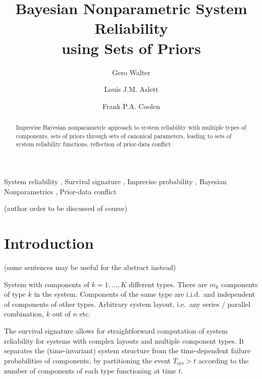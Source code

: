 \documentclass[12pt, a4paper]{elsarticle}
\def\Tsys{T_\text{sys}}
\begin{document}

\begin{frontmatter}
\title{Bayesian Nonparametric System Reliability\\ using Sets of Priors}

\author[ein]{Gero Walter}
\author[oxf]{Louis J.M. Aslett}
\author[dur]{Frank P.A. Coolen}

\address[ein]{School of Industrial Engineering, Eindhoven University of Technology, Eindhoven, NL}
\address[oxf]{Department of Statistics, University of Oxford, Oxford, UK}
\address[dur]{Department of Mathematical Sciences, Durham University, Durham, UK}


\begin{abstract}
Imprecise Bayesian nonparametric approach to system reliability with multiple types of components,
sets of priors through sets of canonical parameters,
leading to sets of system reliability functions,
reflection of prior-data conflict
\end{abstract}

\begin{keyword}
System reliability \sep
Survival signature \sep
Imprecise probability \sep
Bayesian Nonparametrics \sep
Prior-data conflict
\end{keyword}
\end{frontmatter}



(author order to be discussed of course)

\section{Introduction}

(some sentences may be useful for the abstract instead)

System with components of $k=1,\ldots,K$ different types.
There are $m_k$ components of type $k$ in the system.
Components of the same type are i.i.d.\ and independent of components of other types.
Arbitrary system layout, i.e.\ any series / parallel combination, $k$ out of $n$ etc.

The survival signature allows for straightforward computation of system reliability
for systems with complex layouts and multiple component types.
It separates the (time-invariant) system structure from the time-dependent failure probabilities of components,
by partitioning the event $\Tsys > t$ according to the number of components of each type functioning at time $t$.
\end{document}
